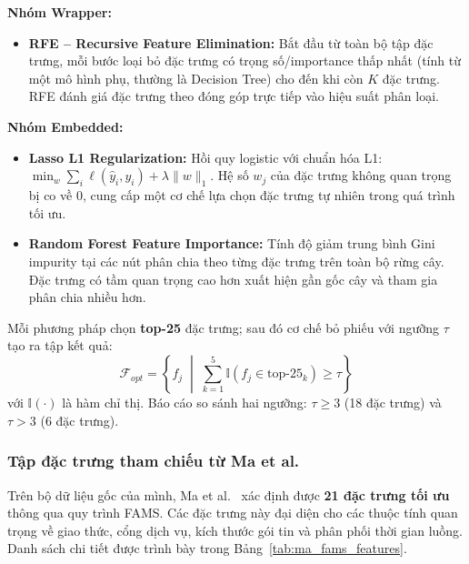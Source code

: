 \textbf{Nhóm Wrapper:}
\begin{itemize}
    \item \textbf{RFE -- Recursive Feature Elimination:} Bắt đầu từ toàn bộ tập đặc trưng, mỗi bước loại bỏ đặc trưng có trọng số/importance thấp nhất (tính từ một mô hình phụ, thường là Decision Tree) cho đến khi còn $K$ đặc trưng. RFE đánh giá đặc trưng theo đóng góp trực tiếp vào hiệu suất phân loại.
\end{itemize}

\textbf{Nhóm Embedded:}
\begin{itemize}
    \item \textbf{Lasso L1 Regularization:} Hồi quy logistic với chuẩn hóa L1: $\min_w \sum_i \ell(\hat{y}_i, y_i) + \lambda \|w\|_1$. Hệ số $w_j$ của đặc trưng không quan trọng bị co về 0, cung cấp một cơ chế lựa chọn đặc trưng tự nhiên trong quá trình tối ưu.
    \item \textbf{Random Forest Feature Importance:} Tính độ giảm trung bình Gini impurity tại các nút phân chia theo từng đặc trưng trên toàn bộ rừng cây. Đặc trưng có tầm quan trọng cao hơn xuất hiện gần gốc cây và tham gia phân chia nhiều hơn.
\end{itemize}

Mỗi phương pháp chọn \textbf{top-25} đặc trưng; sau đó cơ chế bỏ phiếu với ngưỡng $\tau$ tạo ra tập kết quả:
\begin{equation}
    \mathcal{F}_{opt} = \left\{ f_j \;\middle|\; \sum_{k=1}^{5} \mathbb{I}(f_j \in \text{top-}25_k) \geq \tau \right\}
\end{equation}
với $\mathbb{I}(\cdot)$ là hàm chỉ thị. Báo cáo so sánh hai ngưỡng: $\tau \geq 3$ (18 đặc trưng) và $\tau > 3$ (6 đặc trưng).

\subsubsection{Tập đặc trưng tham chiếu từ Ma et al.}

Trên bộ dữ liệu gốc của mình, Ma et al.~\cite{ma2023fams} xác định được \textbf{21 đặc trưng tối ưu} thông qua quy trình FAMS. Các đặc trưng này đại diện cho các thuộc tính quan trọng về giao thức, cổng dịch vụ, kích thước gói tin và phân phối thời gian luồng. Danh sách chi tiết được trình bày trong Bảng~\ref{tab:ma_fams_features}.

